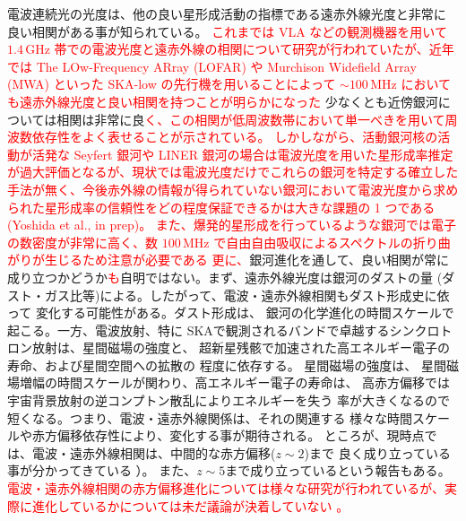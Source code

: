電波連続光の光度は、他の良い星形成活動の指標である遠赤外線光度と非常に
良い相関がある事が知られている\citep{1992ARA&A..30..575C,2001ApJ...554..803Y}。
\textcolor{red}{これまでは VLA などの観測機器を用いて $1.4\,\mathrm{GHz}$ 帯での電波光度と遠赤外線の相関について研究が行われていたが、近年では The LOw-Frequency ARray (LOFAR) や Murchison Widefield Array (MWA) といった SKA-low の先行機を用いることによって $\sim 100\,\mathrm{MHz}$ においても遠赤外線光度と良い相関を持つことが明らかになった \citep[e.g.,][]{2017MNRAS.469.3468C, 2018MNRAS.480.5625R}}
少なくとも近傍銀河については相関は非常に良\textcolor{red}{く、この相関が低周波数帯において単一べきを用いて周波数依存性をよく表せることが示されている。
しかしながら、活動銀河核の活動が活発な Seyfert 銀河や LINER 銀河の場合は電波光度を用いた星形成率推定が過大評価となるが、現状では電波光度だけでこれらの銀河を特定する確立した手法が無く、今後赤外線の情報が得られていない銀河において電波光度から求められた星形成率の信頼性をどの程度保証できるかは大きな課題の 1 つである (Yoshida et al., in prep)。
また、爆発的星形成を行っているような銀河では電子の数密度が非常に高く、数 $100\,\mathrm{MHz}$ で自由自由吸収によるスペクトルの折り曲がりが生じるため注意が必要である \citep{2017MNRAS.468.946S, 2018MNRAS.474..779G}}
\textcolor{red}{更に、}銀河進化を通して、良い相関が常に成り立つかどうか\textcolor{red}{も}自明ではない。まず、遠赤外線光度は銀河のダストの量
(ダスト・ガス比等)による。したがって、電波・遠赤外線相関もダスト形成史に依って
変化する可能性がある\citep{2013MNRAS.429.3390H}。ダスト形成は、
銀河の化学進化の時間スケールで起こる。一方、電波放射、特に
SKAで観測されるバンドで卓越するシンクロトロン放射は、星間磁場の強度と、
超新星残骸で加速された高エネルギー電子の寿命、および星間空間への拡散の
程度に依存する\citep{2006ApJ...651L.111M}。
星間磁場の強度は、
星間磁場増幅の時間スケールが関わり、高エネルギー電子の寿命は、
高赤方偏移では宇宙背景放射の逆コンプトン散乱によりエネルギーを失う
率が大きくなるので短くなる。つまり、電波・遠赤外線関係は、それの関連する
様々な時間スケールや赤方偏移依存性により、変化する事が期待される。
ところが、現時点では、電波・遠赤外線相関は、中間的な赤方偏移($z\sim 2$)まで
良く成り立っている事が分かってきている
\citep[e.g.,][]{2002A&A...384L..19G,2003MNRAS.341L...1G,2008MNRAS.386..953I,2009ApJ...706..482M}）。
また、$z\sim5$まで成り立っているという報告もある\citep{2010ApJ...712..942M}。
\textcolor{red}{電波・遠赤外線相関の赤方偏移進化については様々な研究が行われているが、実際に進化しているかについては未だ議論が決着していない \citep[e.g.,][]{2014MNRAS.445.2232S, 2017MNRAS.469.3468C}。}

